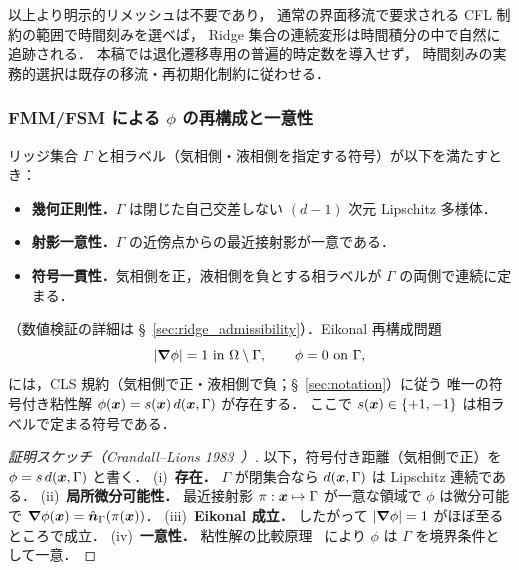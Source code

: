 以上より明示的リメッシュは不要であり，
通常の界面移流で要求される CFL 制約の範囲で時間刻みを選べば，
Ridge 集合の連続変形は時間積分の中で自然に追跡される．
本稿では退化遷移専用の普遍的時定数を導入せず，
時間刻みの実務的選択は既存の移流・再初期化制約に従わせる．

\subsubsection{FMM/FSM による \texorpdfstring{$\phi$}{phi} の再構成と一意性}
\label{sec:ridge_fmm_reconstruction}

\begin{theorem}
\label{thm:eikonal_reconstruction}
リッジ集合 $\Gamma$ と相ラベル（気相側・液相側を指定する符号）が以下を満たすとき：
\begin{itemize}[leftmargin=1.5em, itemsep=0pt, topsep=2pt]
  \item\textbf{幾何正則性．}$\Gamma$ は閉じた自己交差しない $(d-1)$ 次元 Lipschitz 多様体．
  \item\textbf{射影一意性．}$\Gamma$ の近傍点からの最近接射影が一意である．
  \item\textbf{符号一貫性．}気相側を正，液相側を負とする相ラベルが $\Gamma$ の両側で連続に定まる．
\end{itemize}
（数値検証の詳細は §~\ref{sec:ridge_admissibility}）．Eikonal 再構成問題
\begin{equation}
  |\bm{\nabla}\phi| = 1 \text{ in } \Omega \setminus \Gamma, \qquad
  \phi = 0 \text{ on } \Gamma,
\end{equation}
には，CLS 規約（気相側で正・液相側で負；§~\ref{sec:notation}）に従う
唯一の符号付き粘性解 $\phi(\bm{x}) = s(\bm{x})\,d(\bm{x}, \Gamma)$ が存在する．
ここで $s(\bm{x})\in\{+1,-1\}$ は相ラベルで定まる符号である．
\end{theorem}

\begin{proof}[\upshape 証明スケッチ（Crandall--Lions 1983~\cite{CrandallLions1983}）]
以下，符号付き距離（気相側で正）を $\phi=s\,d(\bm{x},\Gamma)$ と書く．
(i)~\textbf{存在．} $\Gamma$ が閉集合なら $d(\bm{x},\Gamma)$ は Lipschitz 連続である．
(ii)~\textbf{局所微分可能性．} 最近接射影 $\pi : \bm{x}\mapsto \Gamma$ が一意な領域で
$\phi$ は微分可能で $\bm{\nabla}\phi(\bm{x}) = \hat{\bm n}_\Gamma(\pi(\bm{x}))$．
(iii)~\textbf{Eikonal 成立．} したがって $|\bm{\nabla}\phi|=1$ がほぼ至るところで成立．
(iv)~\textbf{一意性．} 粘性解の比較原理~\cite{CrandallLions1983} により
$\phi$ は $\Gamma$ を境界条件として一意．
\end{proof}

